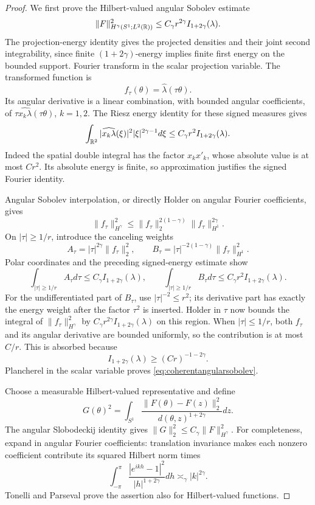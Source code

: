 \begin{proof}
We first prove the Hilbert-valued angular Sobolev estimate
\begin{equation}\label{eq:coherentangularsobolev}
\|F\|_{H^\gamma(S^1;L^2(\mathbb R))}^2
\leq C_\gamma r^{2\gamma}I_{1+2\gamma}(\lambda).
\end{equation}
The projection-energy identity gives the projected densities and their joint second integrability, since finite \((1+2\gamma)\)-energy implies finite first energy on the bounded support. Fourier transform in the scalar projection variable. The transformed function is
$$
f_\tau(\theta)=\widehat\lambda(\tau\theta).
$$
Its angular derivative is a linear combination, with bounded angular coefficients, of \(\tau\widehat{x_k\lambda}(\tau\theta)\), \(k=1,2\). The Riesz energy identity for these signed measures gives
$$
\int_{\mathbb R^2}|\widehat{x_k\lambda}(\xi)|^2|\xi|^{2\gamma-1}d\xi
\leq C_\gamma r^2I_{1+2\gamma}(\lambda).
$$
Indeed the spatial double integral has the factor \(x_kx'_k\), whose absolute value is at most \(Cr^2\). Its absolute energy is finite, so approximation justifies the signed Fourier identity.

Angular Sobolev interpolation, or directly Holder on angular Fourier coefficients, gives
$$
\|f_\tau\|_{H^\gamma}^2
\leq\|f_\tau\|_2^{2(1-\gamma)}\|f_\tau\|_{H^1}^{2\gamma}.
$$
On \(|\tau|\geq1/r\), introduce the canceling weights
$$
A_\tau=|\tau|^{2\gamma}\|f_\tau\|_2^2,
\qquad
B_\tau=|\tau|^{-2(1-\gamma)}\|f_\tau\|_{H^1}^2.
$$
Polar coordinates and the preceding signed-energy estimate show
$$
\int_{|\tau|\geq1/r}A_\tau d\tau\leq C_\gamma I_{1+2\gamma}(\lambda),
\qquad
\int_{|\tau|\geq1/r}B_\tau d\tau\leq C_\gamma r^2I_{1+2\gamma}(\lambda).
$$
For the undifferentiated part of \(B_\tau\), use \(|\tau|^{-2}\leq r^2\); its derivative part has exactly the energy weight after the factor \(\tau^2\) is inserted. Holder in \(\tau\) now bounds the integral of \(\|f_\tau\|_{H^\gamma}^2\) by \(C_\gamma r^{2\gamma}I_{1+2\gamma}(\lambda)\) on this region. When \(|\tau|\leq1/r\), both \(f_\tau\) and its angular derivative are bounded uniformly, so the contribution is at most \(C/r\). This is absorbed because
$$
I_{1+2\gamma}(\lambda)\geq (Cr)^{-1-2\gamma}.
$$
Plancherel in the scalar variable proves \eqref{eq:coherentangularsobolev}.

Choose a measurable Hilbert-valued representative and define
$$
G(\theta)^2
=\int_{S^1}\frac{\|F(\theta)-F(z)\|_2^2}{d(\theta,z)^{1+2\gamma}}dz.
$$
The angular Slobodeckij identity gives \(\|G\|_2^2\leq C_\gamma\|F\|_{H^\gamma}^2\). For completeness, expand in angular Fourier coefficients: translation invariance makes each nonzero coefficient contribute its squared Hilbert norm times
$$
\int_{-\pi}^{\pi}\frac{|e^{ikh}-1|^2}{|h|^{1+2\gamma}}dh
\asymp_\gamma |k|^{2\gamma}.
$$
Tonelli and Parseval prove the assertion also for Hilbert-valued functions.


\end{proof}
